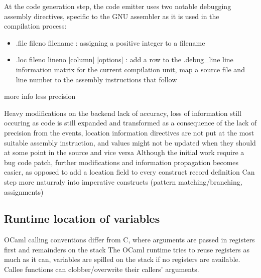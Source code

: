 At the code generation step, the code emitter uses two notable debugging
assembly directives, specific to the GNU assembler as it is used in the
compilation process:


\begin{itemize}
    \item .file fileno filename : assigning a positive integer to a filename
    \item .loc fileno lineno [column] [options] : add a row to the .debug\_line
        line information matrix for the current compilation unit, map a source
        file and line number to the assembly instructions that follow
\end{itemize}

\begin{description}
\pro more info
\con less precision
\end{description}

\begin{itemize}
\fail
Heavy modifications on the backend
lack of accuracy, loss of information still occuring as code is still expanded and transformed
as a consequence of the lack of precision from the events,
location information directives are not put at the
most suitable assembly instruction, and values might not be updated when they should
at some point in the source
and vice versa
\tick Although the initial work require a bug code patch, further modifications
and information propagation becomes easier, as opposed to add a location field
to every construct record definition
\tick Can step more naturraly into imperative constructs
(pattern matching/branching, assignments)
\end{itemize}

\subsection{Runtime location of variables}

OCaml calling conventions differ from C, where arguments are passed in registers first
and remainders on the stack
The OCaml runtime tries to reuse registers as much as it can, variables
are spilled on the stack if no registers are available.
Callee functions can clobber/overwrite their callers' arguments.

